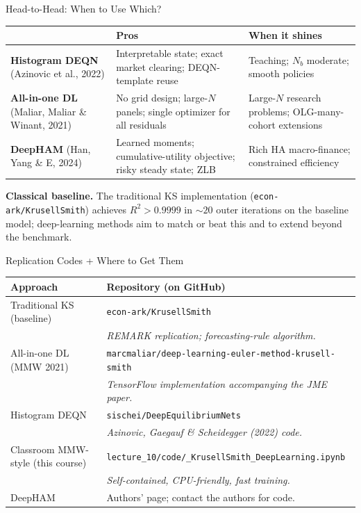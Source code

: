 \documentclass[aspectratio=169,11pt]{beamer}
\begin{document}
\begin{frame}{Head-to-Head: When to Use Which?}
\footnotesize
\begin{center}
\begin{tabular}{p{3.2cm} p{3.6cm} p{3.6cm}}
\toprule
 & \textbf{Pros} & \textbf{When it shines} \\
\midrule
\textbf{Histogram DEQN} (Azinovic et al., 2022) & Interpretable state; exact market clearing; DEQN-template reuse & Teaching; $N_b$ moderate; smooth policies \\
\addlinespace
\textbf{All-in-one DL} (Maliar, Maliar \& Winant, 2021) & No grid design; large-$N$ panels; single optimizer for all residuals & Large-$N$ research problems; OLG-many-cohort extensions \\
\addlinespace
\textbf{DeepHAM} (Han, Yang \& E, 2024) & Learned moments; cumulative-utility objective; risky steady state; ZLB & Rich HA macro-finance; constrained efficiency \\
\bottomrule
\end{tabular}
\end{center}

\vspace{0.2em}
{\scriptsize \textbf{Classical baseline.} The traditional KS implementation (\texttt{econ-ark/KrusellSmith}) achieves $R^2 > 0.9999$ in $\sim 20$ outer iterations on the baseline model; deep-learning methods aim to match or beat this and to extend beyond the benchmark.}
\end{frame}

\begin{frame}{Replication Codes + Where to Get Them}
\scriptsize
\begin{center}
\begin{tabular}{p{3.3cm} p{7.5cm}}
\toprule
\textbf{Approach} & \textbf{Repository (on GitHub)} \\
\midrule
Traditional KS (baseline) & \texttt{econ-ark/KrusellSmith} \\
& \quad\emph{REMARK replication; forecasting-rule algorithm.} \\
\addlinespace
All-in-one DL (MMW 2021) & \texttt{marcmaliar/deep-learning-\allowbreak euler-method-\allowbreak krusell-smith} \\
& \quad\emph{TensorFlow implementation accompanying the JME paper.} \\
\addlinespace
Histogram DEQN & \texttt{sischei/DeepEquilibriumNets} \\
& \quad\emph{Azinovic, Gaegauf \& Scheidegger (2022) code.} \\
\addlinespace
Classroom MMW-style (this course) & \texttt{lecture\_10/\allowbreak code/\allowbreak 12\_KrusellSmith\_\allowbreak DeepLearning.ipynb} \\
& \quad\emph{Self-contained, CPU-friendly, fast training.} \\
\addlinespace
DeepHAM & Authors' page; contact the authors for code. \\
\bottomrule
\end{tabular}
\end{center}
\end{frame}
\end{document}
